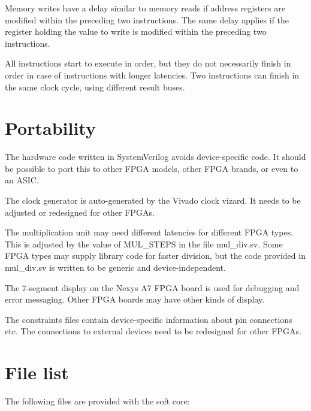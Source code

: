 \documentclass[11pt,a4paper,oneside,openright]{report}
\newcommand{\vv}{ \vspace{2mm} }   %
\begin{document}
Memory writes have a delay similar to memory reads if address registers are modified within the preceding two instructions. The same delay applies if the register holding the value to write is modified within the preceding two instructions.
\vv

All instructions start to execute in order, but they do not necessarily finish in order in case of instructions with longer latencies. Two instructions can finish in the same clock cycle, using different result buses.
\vv


\section{Portability}
The hardware code written in SystemVerilog avoids device-specific code. It should be possible to port this to other FPGA models, other FPGA brands, or even to an ASIC.
\vv

The clock generator is auto-generated by the Vivado clock vizard. It needs to be adjusted or redesigned for other FPGAs.
\vv

The multiplication unit may need different latencies for different FPGA types. This is adjusted by the value of MUL\_STEPS in the file mul\_div.sv. Some FPGA types may supply library code for faster division, but the code provided in mul\_div.sv is written to be generic and device-independent.
\vv

The 7-segment display on the Nexys A7 FPGA board is used for debugging and error messaging. Other FPGA boards may have other kinds of display.
\vv

The constraints files contain device-specific information about pin connections etc. The connections to external devices need to be redesigned for other FPGAs.
\vv


\section{File list}
The following files are provided with the soft core:
\end{document}
